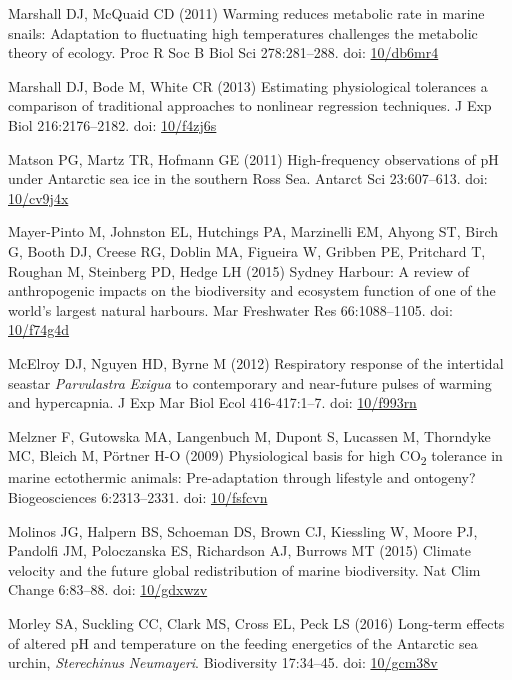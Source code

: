 \documentclass[a4paper,10pt, oneside]{memoir}
\begin{document}
\leavevmode\hypertarget{ref-Marshall2011}{}%
Marshall DJ, McQuaid CD (2011) Warming reduces metabolic rate in marine snails: Adaptation to fluctuating high temperatures challenges the metabolic theory of ecology. Proc R Soc B Biol Sci 278:281--288. doi: \href{https://doi.org/10/db6mr4}{10/db6mr4}

\leavevmode\hypertarget{ref-Marshall2013}{}%
Marshall DJ, Bode M, White CR (2013) Estimating physiological tolerances a comparison of traditional approaches to nonlinear regression techniques. J Exp Biol 216:2176--2182. doi: \href{https://doi.org/10/f4zj6s}{10/f4zj6s}

\leavevmode\hypertarget{ref-Matson2011}{}%
Matson PG, Martz TR, Hofmann GE (2011) High-frequency observations of pH under Antarctic sea ice in the southern Ross Sea. Antarct Sci 23:607--613. doi: \href{https://doi.org/10/cv9j4x}{10/cv9j4x}

\leavevmode\hypertarget{ref-Mayer-Pinto2015}{}%
Mayer-Pinto M, Johnston EL, Hutchings PA, Marzinelli EM, Ahyong ST, Birch G, Booth DJ, Creese RG, Doblin MA, Figueira W, Gribben PE, Pritchard T, Roughan M, Steinberg PD, Hedge LH (2015) Sydney Harbour: A review of anthropogenic impacts on the biodiversity and ecosystem function of one of the world's largest natural harbours. Mar Freshwater Res 66:1088--1105. doi: \href{https://doi.org/10/f74g4d}{10/f74g4d}

\leavevmode\hypertarget{ref-McElroy2012}{}%
McElroy DJ, Nguyen HD, Byrne M (2012) Respiratory response of the intertidal seastar \emph{Parvulastra} \emph{Exigua} to contemporary and near-future pulses of warming and hypercapnia. J Exp Mar Biol Ecol 416-417:1--7. doi: \href{https://doi.org/10/f993rn}{10/f993rn}

\leavevmode\hypertarget{ref-Melzner2009}{}%
Melzner F, Gutowska MA, Langenbuch M, Dupont S, Lucassen M, Thorndyke MC, Bleich M, Pörtner H-O (2009) Physiological basis for high CO\textsubscript{2} tolerance in marine ectothermic animals: Pre-adaptation through lifestyle and ontogeny? Biogeosciences 6:2313--2331. doi: \href{https://doi.org/10/fsfcvn}{10/fsfcvn}

\leavevmode\hypertarget{ref-Molinos2015}{}%
Molinos JG, Halpern BS, Schoeman DS, Brown CJ, Kiessling W, Moore PJ, Pandolfi JM, Poloczanska ES, Richardson AJ, Burrows MT (2015) Climate velocity and the future global redistribution of marine biodiversity. Nat Clim Change 6:83--88. doi: \href{https://doi.org/10/gdxwzv}{10/gdxwzv}

\leavevmode\hypertarget{ref-Morley2016}{}%
Morley SA, Suckling CC, Clark MS, Cross EL, Peck LS (2016) Long-term effects of altered pH and temperature on the feeding energetics of the Antarctic sea urchin, \emph{Sterechinus} \emph{Neumayeri}. Biodiversity 17:34--45. doi: \href{https://doi.org/10/gcm38v}{10/gcm38v}
\end{document}
